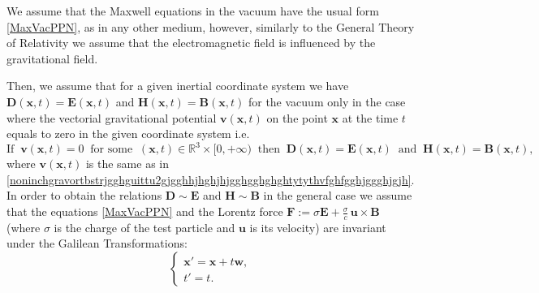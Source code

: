 \documentclass{article}
\theoremstyle{definition}
\theoremstyle{remark}
\renewcommand{\vec}[1]{\mathbf{#1}}
\newcommand{\R}{\mathbb{R}}
\newcommand{\er}{\eqref}
\newcommand{\R}{{\mathbb{R}}}
\newcommand{\er}{\eqref}
\begin{document}
 We assume that the Maxwell equations in the vacuum
have the usual form \er{MaxVacPPN}, as in any other medium,
however, similarly to the General Theory of Relativity we assume
that the electromagnetic field is influenced by the gravitational
field.
%
%
%
\begin{comment}
i.e.
\begin{equation}\label{MaxVacPPN}
\begin{cases}
curl_{\vec x} \vec H\equiv \frac{4\pi}{c}\vec j+\frac{1}{c}\frac{\partial \vec D}{\partial t}\quad\text{for}\;\;(\vec x,t)\in\R^3\times[0,+\infty),\\
div_{\vec x} \vec D\equiv 4\pi\rho\quad\quad\text{for}\;\;(\vec x,t)\in\R^3\times[0,+\infty),\\
curl_{\vec x} \vec E+\frac{1}{c}\frac{\partial \vec B}{\partial t}\equiv 0\quad\quad\text{for}\;\;(\vec x,t)\in\R^3\times[0,+\infty),\\
div_{\vec x} \vec B\equiv 0\quad\quad\text{for}\;\;(\vec
x,t)\in\R^3\times[0,+\infty),
\end{cases}
\end{equation}
\end{comment}
%
%
%
Then, we assume that for a given inertial coordinate system we have
$\vec D(\vec x,t)= \vec E(\vec x,t)$ and $\vec H(\vec x,t)=\vec
B(\vec x,t)$ for the vacuum only in the case where the vectorial
gravitational potential $\vec v(\vec x,t)$ on the point $\vec x$ at
the time $t$ equals to zero in the given coordinate system i.e.
\begin{equation}\label{IdspEthPPN}
\text{If}\;\;\vec v(\vec x,t)=0\;\;\text{for some}\;\;(\vec
x,t)\in\R^3\times[0,+\infty)\;\;\text{then}\;\;\vec D(\vec x,t)=
\vec E(\vec x,t)\;\;\text{and}\;\;\vec H(\vec x,t)=\vec B(\vec x,t),
\end{equation}
where $\vec v(\vec x,t)$ is the same as in
\er{noninchgravortbstrjgghguittu2gjgghhjhghjhjgghgghghghtytythvfghfgghjggghjgjh}.
In order to obtain the relations $\vec D\sim \vec E$ and $\vec H\sim
\vec B$ in the general case we assume that the equations
\er{MaxVacPPN} and the Lorentz force $\vec F:=\sigma \vec
E+\frac{\sigma}{c}\,\vec u\times \vec B$ (where $\sigma$ is the
charge of the test particle and $\vec u$ is its velocity) are
invariant under the Galilean Transformations:
\begin{equation}\label{Gal2PPN}
\begin{cases}
\vec x'=\vec x+t\vec w,\\
t'=t.
\end{cases}
\end{equation}
\end{document}
